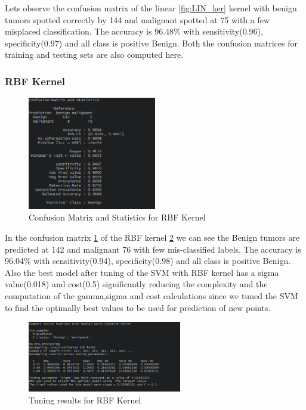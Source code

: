 \documentclass[conference]{IEEEtran}
\begin{document}
Lets observe the confusion matrix of the linear \ref{fig:LIN_ker} kernel with benign tumors spotted correctly by 144 and malignant spotted at 75 with a few  misplaced classification. The accuracy is 96.48\% with sensitivity(0.96), specificity(0.97) and all class is positive Benign. Both the confusion matrices for training and testing sets are also computed here.
\subsubsection{RBF Kernel}

\begin{figure}[ht!]
\centering
\includegraphics[width=0.5\textwidth]{figs/ConfMatRBF.png}
\caption{Confusion Matrix and Statistics for RBF Kernel}
\label{fig:RBF_conf} 
\end{figure}

In the confusion matrix \ref{fig:RBF_conf} of the RBF kernel \ref{fig:RBF_ker} we can see the Benign tumors \cite{UCI} are predicted at 142 and malignant 76 with few mis-classified labels. The accuracy is 96.04\% with sensitivity(0.94), specificity(0.98) and all class is positive Benign. Also the best model after tuning of the SVM with RBF kernel has a sigma value(0.018) and cost(0.5) significantly reducing the complexity and the computation of the gamma,sigma and cost calculations since we tuned the SVM to find the optimally best values to be used for prediction of new points.

\begin{figure}[ht!]
\centering
\includegraphics[width=0.6\textwidth]{figs/after_tuning_radial.png}
\caption{Tuning results for RBF Kernel}
\label{fig:RBF_ker} 
\end{figure}
\end{document}
